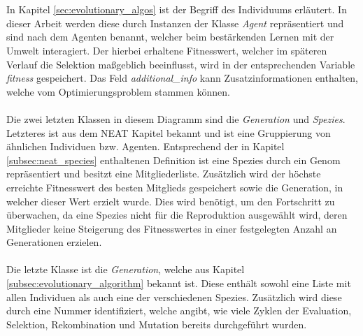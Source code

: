 \\\\
In Kapitel \ref{sec:evolutionary_algos} ist der Begriff des Individuums erläutert. In dieser Arbeit werden diese durch Instanzen der Klasse \emph{Agent} repräsentiert und sind nach dem Agenten benannt, welcher beim bestärkenden Lernen mit der Umwelt interagiert. Der hierbei erhaltene Fitnesswert, welcher im späteren Verlauf die Selektion maßgeblich beeinflusst, wird in der entsprechenden Variable \emph{fitness} gespeichert. Das Feld \emph{additional\_info} kann Zusatzinformationen enthalten, welche vom Optimierungsproblem stammen können.
\\\\
Die zwei letzten Klassen in diesem Diagramm sind die \emph{Generation} und \emph{Spezies}. Letzteres ist aus dem \ac{NEAT} Kapitel bekannt und ist eine Gruppierung von ähnlichen Individuen bzw. Agenten. Entsprechend der in Kapitel \ref{subsec:neat_species} enthaltenen Definition ist eine Spezies durch ein Genom repräsentiert und besitzt eine Mitgliederliste. Zusätzlich wird der höchste erreichte Fitnesswert des besten Mitglieds gespeichert sowie die Generation, in welcher dieser Wert erzielt wurde. Dies wird benötigt, um den Fortschritt zu überwachen, da eine Spezies nicht für die Reproduktion ausgewählt wird, deren Mitglieder keine Steigerung des Fitnesswertes in einer festgelegten Anzahl an Generationen erzielen.
\\\\
Die letzte Klasse ist die \emph{Generation}, welche aus Kapitel \ref{subsec:evolutionary_algorithm} bekannt ist. Diese enthält sowohl eine Liste mit allen Individuen als auch eine der verschiedenen Spezies. Zusätzlich wird diese durch eine Nummer identifiziert, welche angibt, wie viele Zyklen der Evaluation, Selektion, Rekombination und Mutation bereits durchgeführt wurden.

